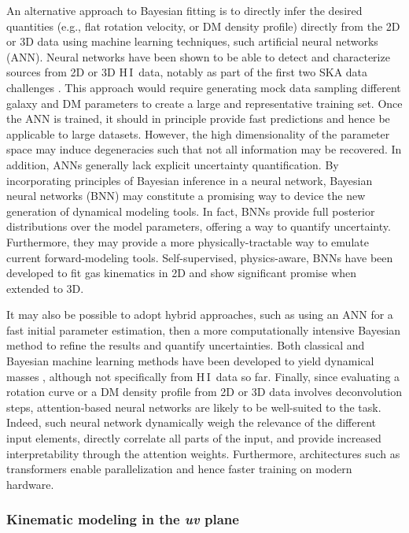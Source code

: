 \documentclass[a4paper,11pt]{article}
\newcommand{\hi } {{\rm H}\,{\small\rm I}}
\begin{document}
An alternative approach to Bayesian fitting is to directly infer the desired quantities (e.g., flat rotation velocity, or DM density profile) directly from the 2D or 3D data using machine learning techniques, such artificial neural networks (ANN). Neural networks have been shown to be able to detect and characterize sources from 2D or 3D \hi\ data, notably as part of the first two SKA data challenges \citep{Bonaldi2021, Hartley2023, Cornu2024, Cornu2025}. This approach would require generating mock data sampling different galaxy and DM parameters to create a large and representative training set. Once the ANN is trained, it should in principle provide fast predictions and hence be applicable to large datasets. However, the high dimensionality of the parameter space may induce degeneracies such that not all information may be recovered. In addition, ANNs generally lack explicit uncertainty quantification. By incorporating principles of Bayesian inference in a neural network, Bayesian neural networks (BNN) may constitute a promising way to device the new generation of dynamical modeling tools. In fact, BNNs provide full posterior distributions over the model parameters, offering a way to quantify uncertainty. Furthermore, they may provide a more physically-tractable way to emulate current forward-modeling tools. Self-supervised, physics-aware, BNNs have been developed to fit gas kinematics in 2D \citep{Dawson2021} and show significant promise when extended to 3D. 

It may also be possible to adopt hybrid approaches, such as using an ANN for a fast initial parameter estimation, then a more computationally intensive Bayesian method to refine the results and quantify uncertainties. Both classical and Bayesian machine learning methods have been developed to yield dynamical masses \citep[e.g.][]{Ntampaka2015, Calderon2019, Villanueva-Domingo2022, Chu2024, Hahn2024}, although not specifically from \hi\ data so far. Finally, since evaluating a rotation curve or a DM density profile from 2D or 3D data involves deconvolution steps, attention-based neural networks are likely to be well-suited to the task. Indeed, such neural network dynamically weigh the relevance of the different input elements, directly correlate all parts of the input, and provide increased interpretability through the attention weights. Furthermore, architectures such as transformers enable parallelization and hence faster training on modern hardware.

\subsubsection{Kinematic modeling in the \emph{uv} plane}\label{sss:uvmodeling}
\end{document}
